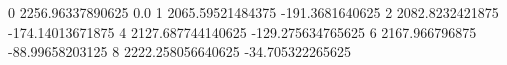0 2256.96337890625 0.0
1 2065.59521484375 -191.3681640625
2 2082.8232421875 -174.14013671875
4 2127.687744140625 -129.275634765625
6 2167.966796875 -88.99658203125
8 2222.258056640625 -34.705322265625
